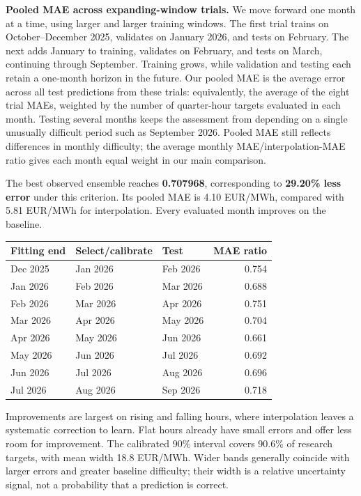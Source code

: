 \documentclass[11pt,a4paper]{article}
\newcommand{\runin}[1]{\textbf{#1}\enspace}
\begin{document}
\runin{Pooled MAE across expanding-window trials.}
We move forward one month at a time, using larger and larger training windows.
The first trial trains on October--December 2025, validates on January 2026,
and tests on February. The next adds January to training, validates on
February, and tests on March, continuing through September. Training grows,
while validation and testing each retain a one-month horizon in the future.
Our pooled MAE is the average error across all test predictions from these
trials: equivalently, the average of the eight trial MAEs, weighted by the
number of quarter-hour targets evaluated in each month. Testing several months
keeps the assessment from depending on a single unusually difficult period
such as September 2026. Pooled MAE still reflects differences in monthly
difficulty; the average monthly MAE/interpolation-MAE ratio gives each month
equal weight in our main comparison.

The best observed ensemble reaches \textbf{0.707968}, corresponding to
\textbf{29.20\% less error} under this criterion. Its pooled MAE is
4.10 EUR/MWh, compared with 5.81 EUR/MWh for interpolation. Every evaluated
month improves on the baseline.

\begin{center}
\small
\begin{tabular}{@{}lllr@{}}
\toprule
Fitting end & Select/calibrate & Test & MAE ratio \\
\midrule
Dec 2025 & Jan 2026 & Feb 2026 & 0.754 \\
Jan 2026 & Feb 2026 & Mar 2026 & 0.688 \\
Feb 2026 & Mar 2026 & Apr 2026 & 0.751 \\
Mar 2026 & Apr 2026 & May 2026 & 0.704 \\
Apr 2026 & May 2026 & Jun 2026 & 0.661 \\
May 2026 & Jun 2026 & Jul 2026 & 0.692 \\
Jun 2026 & Jul 2026 & Aug 2026 & 0.696 \\
Jul 2026 & Aug 2026 & Sep 2026 & 0.718 \\
\bottomrule
\end{tabular}
\end{center}

Improvements are largest on rising and falling hours, where interpolation
leaves a systematic correction to learn. Flat hours already have small errors
and offer less room for improvement. The calibrated 90\% interval covers
90.6\% of research targets, with mean width 18.8 EUR/MWh. Wider bands generally
coincide with larger errors and greater baseline difficulty; their width is
a relative uncertainty signal, not a probability that a prediction is correct.
\end{document}
